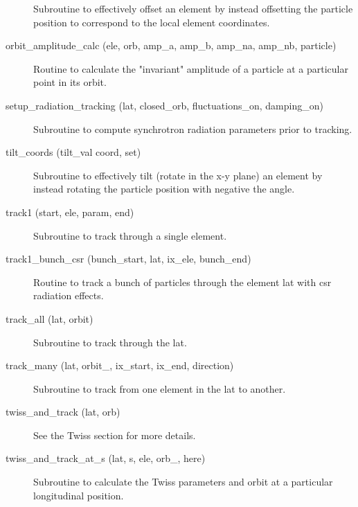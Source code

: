 \begin{description}
\item[\protect\parbox{6in}{offset_particle (ele, param, coord, set, 
set_canonical, \\
\hspace*{2in} set_tilt, set_multipoles, set_hvkicks, s_pos)}] \Newline
Subroutine to effectively offset an element by instead offsetting 
the particle position to correspond to the local element coordinates. 

\item[orbit_amplitude_calc (ele, orb, amp_a, amp_b, amp_na, amp_nb, particle)] \Newline
Routine to calculate the "invariant" amplitude of a particle at a 
particular point in its orbit. 

\item[setup_radiation_tracking (lat, closed_orb, fluctuations_on, damping_on)] \Newline
Subroutine to compute synchrotron radiation parameters prior to tracking. 

\item[tilt_coords (tilt_val coord, set)] \Newline
Subroutine to effectively tilt (rotate in the x-y plane) an element by 
instead rotating the particle position with negative the angle. 

\item[track1 (start, ele, param, end)] \Newline
Subroutine to track through a single element. 

\item[track1_bunch_csr (bunch_start, lat, ix_ele, bunch_end)] \Newline 
Routine to track a bunch of particles through the element lat%
with csr radiation effects.

\item[track_all (lat, orbit)] \Newline
Subroutine to track through the lat. 

\item[track_many (lat, orbit_, ix_start, ix_end, direction)] \Newline
Subroutine to track from one element in the lat to another. 

\item[twiss_and_track (lat, orb)] \Newline
See the Twiss section for more details. 

\item[twiss_and_track_at_s (lat, s, ele, orb_, here)] \Newline
Subroutine to calculate the Twiss parameters and orbit at a particular longitudinal position. 


\end{description}
